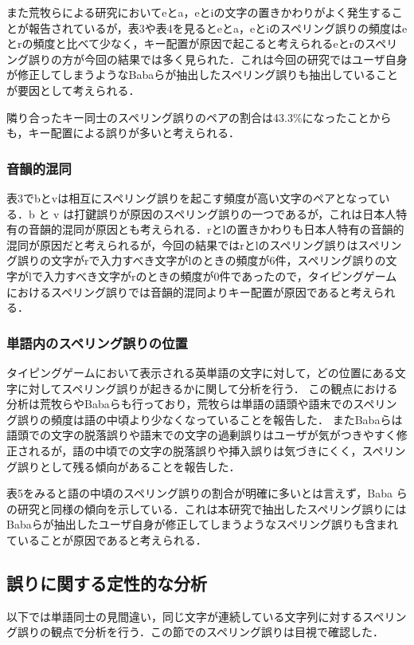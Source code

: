 \documentclass{jarticle}
\begin{document}
また荒牧らによる研究\cite{aramakiNLP2010}においてeとa，eとiの文字の置きかわりがよく発生することが報告されているが，表3や表4を見るとeとa，eとiのスペリング誤りの頻度はeとrの頻度と比べて少なく，キー配置が原因で起こると考えられるeとrのスペリング誤りの方が今回の結果では多く見られた．これは今回の研究ではユーザ自身が修正してしまうようなBabaらが抽出したスペリング誤り\cite{babaACL2012}も抽出していることが要因として考えられる．

隣り合ったキー同士のスペリング誤りのペアの割合は43.3\%になったことからも，キー配置による誤りが多いと考えられる．

\subsubsection{音韻的混同}
表3でbとvは相互にスペリング誤りを起こす頻度が高い文字のペアとなっている．b と v は打鍵誤りが原因のスペリング誤りの一つであるが，これは日本人特有の音韻的混同が原因とも考えられる．rとlの置きかわりも日本人特有の音韻的混同が原因だと考えられるが，今回の結果ではrとlのスペリング誤りはスペリング誤りの文字がrで入力すべき文字がlのときの頻度が6件，スペリング誤りの文字がlで入力すべき文字がrのときの頻度が0件であったので，タイピングゲームにおけるスペリング誤りでは音韻的混同よりキー配置が原因であると考えられる．

\subsubsection{単語内のスペリング誤りの位置}
タイピングゲームにおいて表示される英単語の文字に対して，どの位置にある文字に対してスペリング誤りが起きるかに関して分析を行う．
この観点における分析は荒牧ら\cite{aramakiNLP2010}やBabaら\cite{babaACL2012}も行っており，荒牧らは単語の語頭や語末でのスペリング誤りの頻度は語の中頃より少なくなっていることを報告した．
またBabaらは語頭での文字の脱落誤りや語末での文字の過剰誤りはユーザが気がつきやすく修正されるが，語の中頃での文字の脱落誤りや挿入誤りは気づきにくく，スペリング誤りとして残る傾向があることを報告した．

表5をみると語の中頃のスペリング誤りの割合が明確に多いとは言えず，Baba らの研究と同様の傾向を示している．これは本研究で抽出したスペリング誤りにはBabaらが抽出したユーザ自身が修正してしまうようなスペリング誤り\cite{babaACL2012}も含まれていることが原因であると考えられる．

\subsection{誤りに関する定性的な分析}
以下では単語同士の見間違い，同じ文字が連続している文字列に対するスペリング誤りの観点で分析を行う．この節でのスペリング誤りは目視で確認した．
\end{document}
